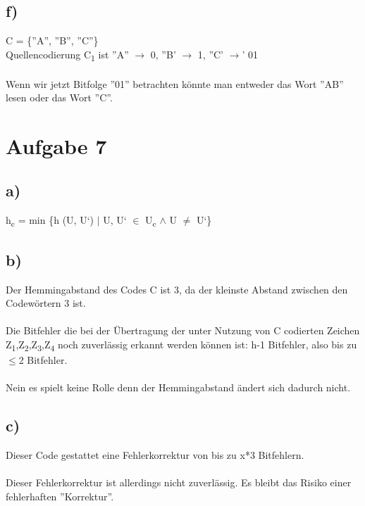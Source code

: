 \documentclass[a4paper,12pt]{scrartcl}
\begin{document}
\subsection{f)}
C = \{''A'', ''B'', ''C''\}\\
Quellencodierung C\textsubscript{1} ist ''A'' $\rightarrow$ 0, ''B' $\rightarrow$ 1, ''C' $\rightarrow$' 01\\\\
Wenn wir jetzt Bitfolge ''01'' betrachten könnte man entweder das Wort ''AB'' lesen oder das Wort ''C''.

\section{Aufgabe 7}
\subsection{a)}
h\textsubscript{c} = min \{h (U, U‘) $\vert$ U, U‘ $\in$ U\textsubscript{c} $\wedge$ U $\not=$ U‘\}

\subsection{b)}
Der Hemmingabstand des Codes C ist 3, da der kleinste Abstand zwischen den Codewörtern 3 ist. \\\\
Die Bitfehler die bei der Übertragung der unter Nutzung von C codierten Zeichen Z\textsubscript{1},Z\textsubscript{2},Z\textsubscript{3},Z\textsubscript{4} noch zuverlässig erkannt werden können ist: h-1 Bitfehler, also bis zu $\leq$2 Bitfehler.\\\\
Nein es spielt keine Rolle denn der Hemmingabstand ändert sich dadurch nicht.

\subsection{c)}
Dieser Code gestattet eine Fehlerkorrektur von bis zu x*3 Bitfehlern.\\\\
Dieser Fehlerkorrektur ist allerdings nicht zuverlässig. Es bleibt das Risiko einer fehlerhaften ''Korrektur''.
\end{document}
